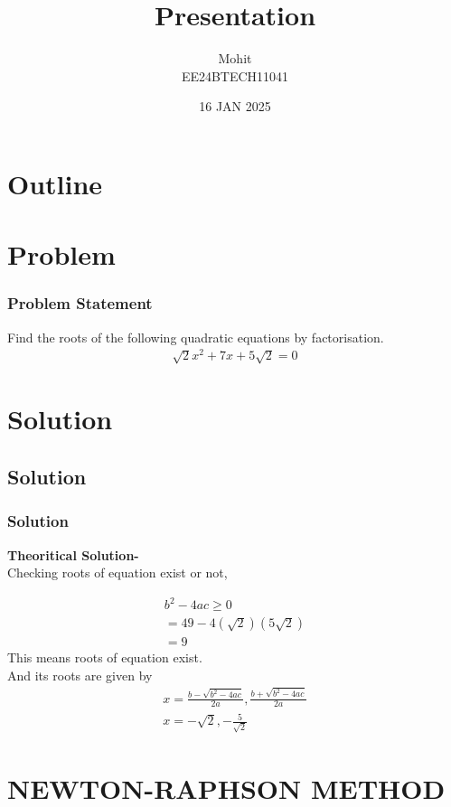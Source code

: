\documentclass{beamer}
\title{Presentation}
\author{Mohit \\ EE24BTECH11041}
\date{16 JAN 2025}
\providecommand{\brak}[1]{\ensuremath{\left(#1\right)}}
\theoremstyle{remark}
\numberwithin{equation}{section}
\begin{document}
\begin{frame}
\titlepage
\end{frame}

\section*{Outline}
\begin{frame}
\tableofcontents
\end{frame}
\section{Problem}
\begin{frame}
\frametitle{Problem Statement}
%
Find the roots of the following quadratic equations by factorisation.
\begin{align}
\sqrt{2}x^2 + 7x + 5\sqrt{2} = 0
\end{align}

\end{frame}

\section{Solution}
\subsection{Solution}
\begin{frame}
\frametitle{Solution}


\textbf{Theoritical Solution-}\\
Checking roots of equation exist or not,

\begin{align}
b^2 - 4ac \geq 0 \\
= 49 - 4(\sqrt{2})\brak{5\sqrt{2}}\\
= 9 
\end{align}
This means roots of equation exist.\\
And its roots are given by 
\begin{align}
x = \frac{b-\sqrt{b^2-4ac}}{2a},\frac{b+\sqrt{b^2-4ac}}{2a}\\
x = -\sqrt{2},-\frac{5}{\sqrt{2}}
\end{align}
    \end{frame}
    


\section{NEWTON-RAPHSON METHOD}
\end{document}
